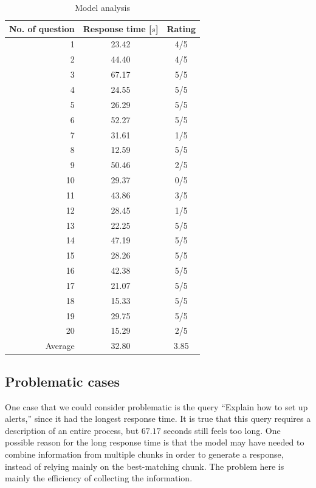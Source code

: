 \documentclass[fleqn,moreauthors,10pt]{ds_report}
\begin{document}
\begin{table}[h]
  \centering
  \caption{Model analysis}
  \label{tab:model_analysis}
  \begin{tabular}[width=1\columnwidth]{r|cc}
    \textbf{No. of question} & \textbf{Response time [$s$]} & \textbf{Rating} \\
    \hline
    1 & 23.42 & 4/5\\
    2 & 44.40 & 4/5\\
    3 & 67.17 & 5/5\\
    4 & 24.55 & 5/5\\
    5 & 26.29 & 5/5\\
    6 & 52.27 & 5/5\\
    7 & 31.61 & 1/5\\
    8 & 12.59 & 5/5\\
    9 & 50.46 & 2/5\\
    10 & 29.37 & 0/5\\
    11 & 43.86 & 3/5\\
    12 & 28.45 & 1/5\\
    13 & 22.25 & 5/5\\
    14 & 47.19 & 5/5\\
    15 & 28.26 & 5/5\\
    16 & 42.38 & 5/5\\
    17 & 21.07 & 5/5\\
    18 & 15.33 & 5/5\\
    19 & 29.75 & 5/5\\
    20 & 15.29 & 2/5\\
    \hdashline
    Average & 32.80 & 3.85 \\
  \end{tabular}
\end{table}

\subsection*{Problematic cases}

One case that we could consider problematic is the query “Explain how to set up alerts,” since it had the longest response time. It is true that this query requires a description of an entire process, but $67.17$ seconds still feels too long. One possible reason for the long response time is that the model may have needed to combine information from multiple chunks in order to generate a response, instead of relying mainly on the best-matching chunk. The problem here is mainly the efficiency of collecting the information.
\end{document}
